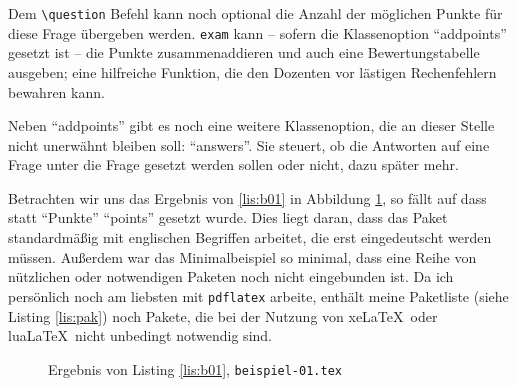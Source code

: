 Dem  \texttt{\textbackslash question} Befehl kann noch optional die Anzahl der möglichen Punkte für diese Frage übergeben werden. \texttt{exam} kann -- sofern die Klassenoption \enquote{addpoints} gesetzt ist -- die Punkte zusammenaddieren und auch eine Bewertungstabelle ausgeben; eine hilfreiche Funktion, die den Dozenten vor lästigen Rechenfehlern bewahren kann.

Neben \enquote{addpoints} gibt es noch eine weitere Klassenoption, die an dieser Stelle nicht unerwähnt bleiben soll: \enquote{answers}. Sie steuert, ob die Antworten auf eine Frage unter die Frage gesetzt werden sollen oder nicht, dazu später mehr.

Betrachten wir uns das Ergebnis von \ref{lis:b01} in Abbildung \ref{fig:b01}, so fällt auf dass statt \enquote{Punkte} \enquote{points} gesetzt wurde. Dies liegt daran, dass das Paket standardmäßig mit englischen Begriffen arbeitet, die erst eingedeutscht werden müssen. Außerdem war das Minimalbeispiel so minimal, dass eine Reihe von nützlichen oder notwendigen Paketen noch nicht eingebunden ist. Da ich persönlich noch am liebsten mit \texttt{pdflatex} arbeite, enthält meine Paketliste (siehe Listing \ref{lis:pak}) noch Pakete, die bei der Nutzung von xe\LaTeX\ oder lua\LaTeX\ nicht unbedingt notwendig sind.

\begin{figure}
\caption{Ergebnis von Listing \ref{lis:b01}, \texttt{beispiel-01.tex}}\label{fig:b01}
\end{figure}

